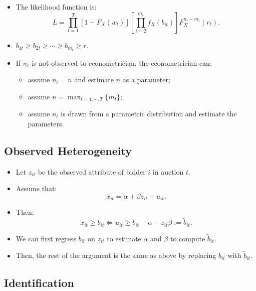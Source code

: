 \documentclass[]{book}
\providecommand{\tightlist}{%
  \setlength{\itemsep}{0pt}\setlength{\parskip}{0pt}}
\begin{document}
\begin{itemize}
\tightlist
\item
  The likelihood function is: \[
  L = \prod_{t = 1}^T [1 - F_X(w_t)] \left[ \prod_{i = 2}^{m_t} f_X(b_{it}) \right] F_X^{n_t - m_t}(r_t).
  \]
\item
  \(b_{1t} \ge b_{2t} \ge \cdots \ge b_{m_t} \ge r\).
\item
  If \(n_t\) is not observed to econometrician, the econometrician can:

  \begin{itemize}
  \tightlist
  \item
    assume \(n_t = n\) and estimate \(n\) as a parameter;
  \item
    assume \(n = \max_{t = 1, \cdots, T} \{m_t\}\);
  \item
    assume \(n_t\) is drawn from a parametric distribution and estimate
    the parameters.
  \end{itemize}
\end{itemize}

\subsection{Observed Heterogeneity}\label{observed-heterogeneity}

\begin{itemize}
\tightlist
\item
  Let \(z_{it}\) be the observed attribute of bidder \(i\) in auction
  \(t\).
\item
  Assume that: \[
  x_{it} = \alpha + \beta z_{it} + u_{it}.
  \]
\item
  Then: \[
  x_{it} \ge b_{it} \Leftrightarrow u_{it} \ge b_{it} - \alpha - z_{it} \beta := \tilde{b}_{it}.
  \]
\item
  We can first regress \(b_{it}\) on \(z_{it}\) to estimate \(\alpha\)
  and \(\beta\) to compute \(\tilde{b}_{it}\).
\item
  Then, the rest of the argument is the same as above by replacing
  \(b_{it}\) with \(\tilde{b}_{it}\).
\end{itemize}

\subsection{Identification}\label{identification-2}
\end{document}
